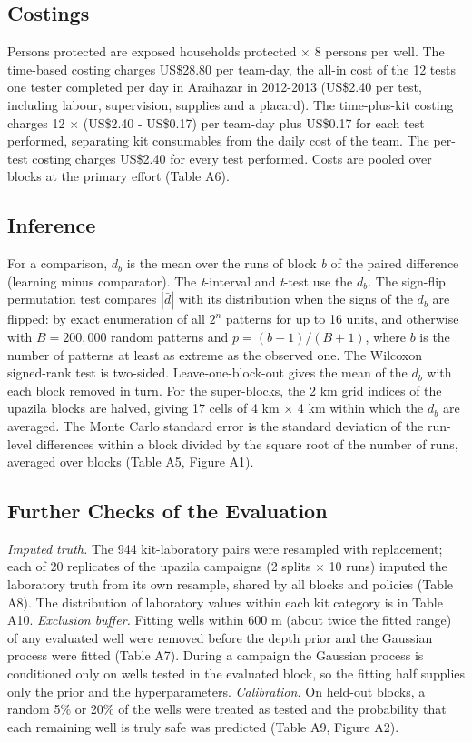 \documentclass[sustainability,article,submit,pdftex,moreauthors]{Definitions/mdpi}
\begin{document}
\subsection{Costings}

Persons protected are exposed households protected $\times$ 8 persons per well. The time-based costing charges US\$28.80 per team-day, the all-in cost of the 12 tests one tester completed per day in Araihazar in 2012-2013 (US\$2.40 per test, including labour, supervision, supplies and a placard). The time-plus-kit costing charges 12 $\times$ (US\$2.40 - US\$0.17) per team-day plus US\$0.17 for each test performed, separating kit consumables from the daily cost of the team. The per-test costing charges US\$2.40 for every test performed. Costs are pooled over blocks at the primary effort (Table A6).

\subsection{Inference}

For a comparison, $d_b$ is the mean over the runs of block \textit{b} of the paired difference (learning minus comparator). The \textit{t}-interval and \textit{t}-test use the $d_b$. The sign-flip permutation test compares $|\bar{d}|$ with its distribution when the signs of the $d_b$ are flipped: by exact enumeration of all $2^n$ patterns for up to 16 units, and otherwise with $B = 200{,}000$ random patterns and $p = (b + 1)/(B + 1)$, where $b$ is the number of patterns at least as extreme as the observed one. The Wilcoxon signed-rank test is two-sided. Leave-one-block-out gives the mean of the $d_b$ with each block removed in turn. For the super-blocks, the 2 km grid indices of the upazila blocks are halved, giving 17 cells of 4 km $\times$ 4 km within which the $d_b$ are averaged. The Monte Carlo standard error is the standard deviation of the run-level differences within a block divided by the square root of the number of runs, averaged over blocks (Table A5, Figure A1).

\subsection{Further Checks of the Evaluation}

\textit{Imputed truth.} The 944 kit-laboratory pairs were resampled with replacement; each of 20 replicates of the upazila campaigns (2 splits $\times$ 10 runs) imputed the laboratory truth from its own resample, shared by all blocks and policies (Table A8). The distribution of laboratory values within each kit category is in Table A10. \textit{Exclusion buffer.} Fitting wells within 600 m (about twice the fitted range) of any evaluated well were removed before the depth prior and the Gaussian process were fitted (Table A7). During a campaign the Gaussian process is conditioned only on wells tested in the evaluated block, so the fitting half supplies only the prior and the hyperparameters. \textit{Calibration.} On held-out blocks, a random 5\% or 20\% of the wells were treated as tested and the probability that each remaining well is truly safe was predicted (Table A9, Figure A2).
\end{document}
